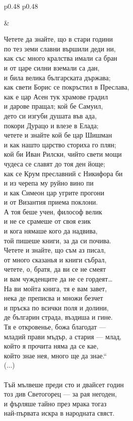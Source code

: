\documentclass[12pt,a4paper]{article}
\begin{document}
\begin{tabular}{p{0.48\textwidth} p{0.48\textwidth}}
\begin{minipage}[t]{\linewidth}
\end{minipage}
&
\begin{minipage}[t]{\linewidth}
Четете да знайте, що в стари години\\
по тез земи славни вършили деди ни,\\
как със много кралства имали са бран\\
и от царе силни вземали са дан,\\
и била велика българската държава;\\
как свети Борис се покръстил в Преслава,\\
как е цар Асен тук храмове градил\\
и дарове пращал; кой бе Самуил,\\
дето си изгуби душата във ада,\\
покори Дурацо и влезе в Елада;\\
четете и знайте кой бе цар Шишман\\
и как нашто царство сториха го плян;\\
кой би Иван Рилски, чийто свети мощи\\
чудеса се славят до тоя ден йоще;\\
как се Крум преславний с Никифора би\\
и из черепа му руйно вино пи\\
и как Симеон цар угрите прогони\\
и от Византия приема поклони.\\
А тоя беше учен, философ велик\\
и не се срамеше от своя език\\
и кога нямаше кого да надвива,\\
той пишеше книги, за да си почива.\\
Четете и знайте, що съм аз писал,\\
от много сказанья и книги събрал,\\
четете, о, братя, да ви се не смеят\\
и вам чужденците да не се гордеят…\\
На ви мойта книга, тя е вам завет,\\
нека де преписва и множи безчет\\
и пръска по всички поля и долини,\\
де българин страда, въздиша и гине.\\
Тя е откровенье, божа благодат —\\
младий прави мъдър, а стария — млад,\\
който я прочита няма да се кае,\\
който знае нея, много ще да знае.“\\
(...)\\
\\
Тъй мълвеше преди сто и двайсет годин\\
тоз див Светогорец — за рая негоден,\\
и фърляше тайно през мрака тогаз\\
най-първата искра в народната свяст.\\
\end{minipage}
\end{tabular}
\\
\end{document}
